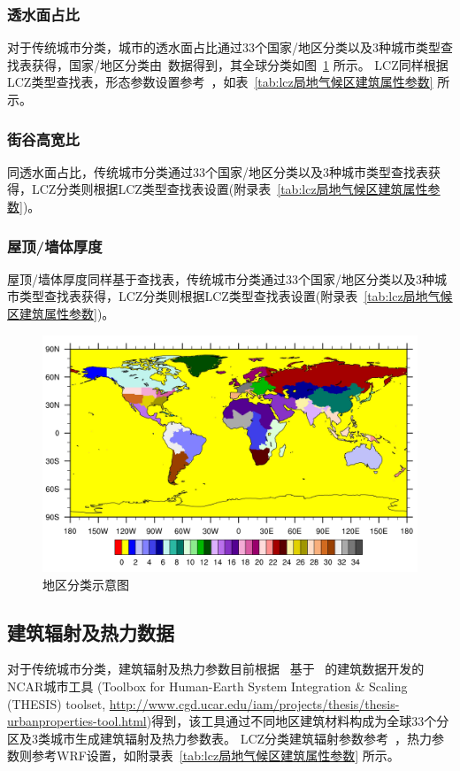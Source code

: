 \subsubsection{透水面占比}\label{透水面占比}
对于传统城市分类，城市的透水面占比通过33个国家/地区分类以及3种城市类型查找表获得，国家/地区分类由~\citet{oleson2020parameterization}数据得到，其全球分类如图~\ref{fig:地区分类} 所示。
LCZ同样根据LCZ类型查找表，形态参数设置参考~\citet{stewart2014evaluation}，如表~\ref{tab:lcz局地气候区建筑属性参数} 所示。

\subsubsection{街谷高宽比}\label{街谷高宽比}
同透水面占比，传统城市分类通过33个国家/地区分类以及3种城市类型查找表获得，LCZ分类则根据LCZ类型查找表设置(附录表~\ref{tab:lcz局地气候区建筑属性参数})。

\subsubsection{屋顶/墙体厚度}\label{屋顶/墙体厚度}
屋顶/墙体厚度同样基于查找表，传统城市分类通过33个国家/地区分类以及3种城市类型查找表获得，LCZ分类则根据LCZ类型查找表设置(附录表~\ref{tab:lcz局地气候区建筑属性参数})。

{
  \begin{figure}[htbp]
    \centering
    \includegraphics[width=.7\paperwidth]{Figures/基础数据/地区分类.jpg}
    \caption{地区分类示意图}
    \label{fig:地区分类}
  \end{figure}
}

\subsection{建筑辐射及热力数据}\label{建筑辐射及热力数据}
对于传统城市分类，建筑辐射及热力参数目前根据~\citet{oleson2020parameterization} 基于~\citet{jackson2010parameterization} 的建筑数据开发的NCAR城市工具
(Toolbox for Human-Earth System Integration \& Scaling (THESIS) toolset, \url{http://www.cgd.ucar.edu/iam/projects/thesis/thesis-urbanproperties-tool.html})得到，该工具通过不同地区建筑材料构成为全球33个分区及3类城市生成建筑辐射及热力参数表。
LCZ分类建筑辐射参数参考~\citet{stewart2014evaluation}，热力参数则参考WRF设置，如附录表~\ref{tab:lcz局地气候区建筑属性参数} 所示。

